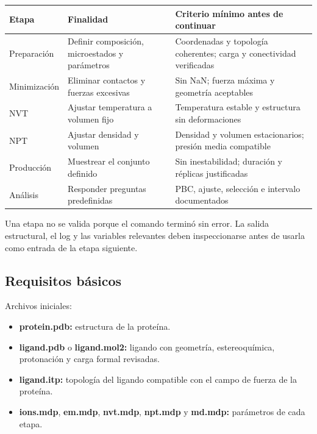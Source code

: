 \documentclass[
  spanish,
  11pt,
  a4paper]{article}
\newcounter{none} %
\providecommand{\tightlist}{%
  \setlength{\itemsep}{0pt}\setlength{\parskip}{0pt}}
\begin{document}
{\def\LTcaptype{none} %
\begin{longtable}[]{@{}
  >{\raggedright\arraybackslash}p{}
  >{\raggedright\arraybackslash}p{}
  >{\raggedright\arraybackslash}p{}@{}}
\toprule\noalign{}
\begin{minipage}[b]{\linewidth}\raggedright
Etapa
\end{minipage} & \begin{minipage}[b]{\linewidth}\raggedright
Finalidad
\end{minipage} & \begin{minipage}[b]{\linewidth}\raggedright
Criterio mínimo antes de continuar
\end{minipage} \\
\midrule\noalign{}
\endhead
\bottomrule\noalign{}
\endlastfoot
Preparación & Definir composición, microestados y parámetros &
Coordenadas y topología coherentes; carga y conectividad verificadas \\
Minimización & Eliminar contactos y fuerzas excesivas & Sin NaN; fuerza
máxima y geometría aceptables \\
NVT & Ajustar temperatura a volumen fijo & Temperatura estable y
estructura sin deformaciones \\
NPT & Ajustar densidad y volumen & Densidad y volumen estacionarios;
presión media compatible \\
Producción & Muestrear el conjunto definido & Sin inestabilidad;
duración y réplicas justificadas \\
Análisis & Responder preguntas predefinidas & PBC, ajuste, selección e
intervalo documentados \\
\end{longtable}
}

Una etapa no se valida porque el comando terminó sin error. La salida
estructural, el log y las variables relevantes deben inspeccionarse
antes de usarla como entrada de la etapa siguiente.

\subsection{Requisitos básicos}\label{requisitos-buxe1sicos}

Archivos iniciales:

\begin{itemize}
\tightlist
\item
  \textbf{protein.pdb:} estructura de la proteína.
\item
  \textbf{ligand.pdb} o \textbf{ligand.mol2:} ligando con geometría,
  estereoquímica, protonación y carga formal revisadas.
\item
  \textbf{ligand.itp:} topología del ligando compatible con el campo de
  fuerza de la proteína.
\item
  \textbf{ions.mdp}, \textbf{em.mdp}, \textbf{nvt.mdp}, \textbf{npt.mdp}
  y \textbf{md.mdp:} parámetros de cada etapa.
\end{itemize}
\end{document}
